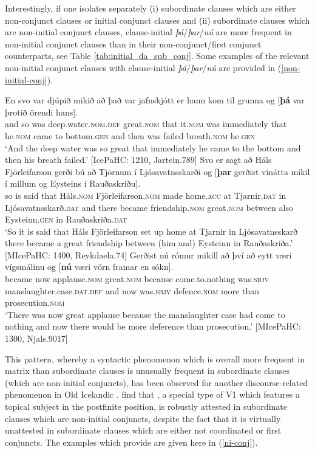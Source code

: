 \documentclass[output=paper,colorlinks,citecolor=brown]{langscibook}
\begin{document}
Interestingly, if one isolates separately (i) subordinate clauses which are either non-conjunct clauses or initial conjunct clauses and (ii) subordinate clauses which are non-initial conjunct clauses, clause-initial \textit{þá}/\textit{þar}/\textit{nú} are more frequent in non-initial conjunct clauses than in their non-conjunct/first conjunct counterparts, see Table \ref{tab:initial_da_sub_conj}. Some examples of the relevant non-initial conjunct clauses with clause-initial \textit{þá}/\textit{þar}/\textit{nú}  are provided in (\ref{non-initial-conj}).



\ea \label{non-initial-conj} 
\ea 
 \gll En svo var djúpið mikið að það var jafnskjótt er hann kom til grunna og [\textbf{þá} var þrotið örendi hans].\\
 and so was deep.water.\textsc{nom.def} great.\textsc{nom} that it.\textsc{nom} was immediately that he.\textsc{nom} came to bottom.\textsc{gen} and then was failed breath.\textsc{nom} he.\textsc{gen}\\
 \glt `And the deep water was so great that immediately he came to the bottom and then his breath failed.' \hfill [IcePaHC: 1210, Jartein.789]
 \ex 
 \gll Svo er sagt að Háls Fjörleifarson gerði bú að Tjörnum í Ljósavatnsskarði og [\textbf{þar} gerðist vinátta mikil {í millum} og Eysteins í Rauðaskriðu].\\
 so is said that Háls.\textsc{nom} Fjörleifarson.\textsc{nom} made home.\textsc{acc} at Tjarnir.\textsc{dat} in Ljósavatnsskarð.\textsc{dat} and there became friendship.\textsc{nom} great.\textsc{nom} between also Eysteinn.\textsc{gen} in Rauðaskriða.\textsc{dat}\\
 \glt `So it is said that Háls Fjörleifarson set up home at Tjarnir in Ljósavatnsskarð there became a great friendship between (him and) Eysteinn in Rauðaskriða.' \hfill [MIcePaHC: 1400, Reykdaela.74]
 \ex 
\gll  Gerðist nú rómur mikill {að því að} eytt væri vígsmálinu og [\textbf{nú} væri vörn framar en sókn].\\
became now applause.\textsc{nom} great.\textsc{nom} because come.to.nothing was.\textsc{sbjv} manslaughter.case.\textsc{dat.def} and now was.\textsc{sbjv} defence.\textsc{nom} more than prosecution.\textsc{nom}\\
\glt `There was now great applause because the manslaughter case had come to nothing and now there would be more deference than prosecution.'  \hfill [MIcePaHC: 1300, Njals.9017]
\z 
\z 

This pattern, whereby a syntactic phenomenon which is overall more frequent in matrix than subordinate clauses is unusually frequent in subordinate clauses (which are non-initial conjuncts), has been observed for another discourse-related phenomenon in Old Icelandic  \citep{booth-beck20200jhs}. \citet[23]{booth-beck20200jhs} find that , a special type of V1 which features a topical subject in the postfinite position, is robustly attested in subordinate clauses which are non-initial conjuncts, despite the fact that it is virtually unattested in subordinate clauses which are either not coordinated or first conjuncts. The examples which \citet{booth-beck20200jhs} provide are given here in (\ref{ni-conj}).
\end{document}
